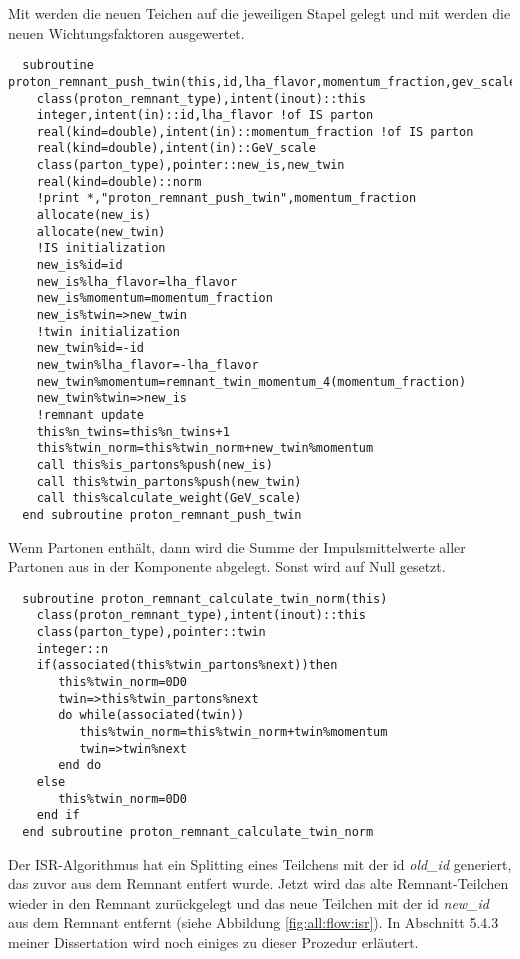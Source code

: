 Mit  werden die neuen Teichen auf die jeweiligen Stapel gelegt und mit\linebreak {} werden die neuen Wichtungsfaktoren ausgewertet.
\begin{Verbatim}
  subroutine proton_remnant_push_twin(this,id,lha_flavor,momentum_fraction,gev_scale)
    class(proton_remnant_type),intent(inout)::this
    integer,intent(in)::id,lha_flavor !of IS parton
    real(kind=double),intent(in)::momentum_fraction !of IS parton
    real(kind=double),intent(in)::GeV_scale
    class(parton_type),pointer::new_is,new_twin
    real(kind=double)::norm
    !print *,"proton_remnant_push_twin",momentum_fraction
    allocate(new_is)    
    allocate(new_twin)
    !IS initialization
    new_is%id=id
    new_is%lha_flavor=lha_flavor
    new_is%momentum=momentum_fraction
    new_is%twin=>new_twin
    !twin initialization
    new_twin%id=-id
    new_twin%lha_flavor=-lha_flavor
    new_twin%momentum=remnant_twin_momentum_4(momentum_fraction)
    new_twin%twin=>new_is
    !remnant update
    this%n_twins=this%n_twins+1
    this%twin_norm=this%twin_norm+new_twin%momentum
    call this%is_partons%push(new_is)
    call this%twin_partons%push(new_twin)
    call this%calculate_weight(GeV_scale)
  end subroutine proton_remnant_push_twin
\end{Verbatim}
Wenn  Partonen enthält, dann wird die Summe der Impulsmittelwerte aller Partonen aus  in der Komponente \linebreak {} abgelegt. Sonst wird  auf Null gesetzt.
\begin{Verbatim}
  subroutine proton_remnant_calculate_twin_norm(this)
    class(proton_remnant_type),intent(inout)::this
    class(parton_type),pointer::twin
    integer::n
    if(associated(this%twin_partons%next))then
       this%twin_norm=0D0
       twin=>this%twin_partons%next
       do while(associated(twin))
          this%twin_norm=this%twin_norm+twin%momentum
          twin=>twin%next
       end do
    else
       this%twin_norm=0D0
    end if
  end subroutine proton_remnant_calculate_twin_norm
\end{Verbatim}
Der ISR-Algorithmus hat ein Splitting eines Teilchens mit der id \emph{old\_id} generiert, das zuvor aus dem Remnant entfert wurde. Jetzt wird das alte Remnant-Teilchen wieder in den Remnant zurückgelegt und das neue Teilchen mit der id \emph{new\_id} aus dem Remnant entfernt (siehe Abbildung \ref{fig:all:flow:isr}). In Abschnitt 5.4.3 meiner Dissertation wird noch einiges zu dieser Prozedur erläutert.
